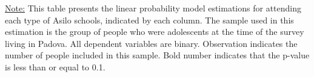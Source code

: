 \begin{footnotesize}
\noindent\underline{Note:} This table presents the linear probability model estimations for attending each type of Asilo schools, indicated by each column. The sample used in this estimation is the group of people who were adolescents at the time of the survey living in Padova. All dependent variables are binary. Observation indicates the number of people included in this sample. Bold number indicates that the p-value is less than or equal to 0.1.
\end{footnotesize}
